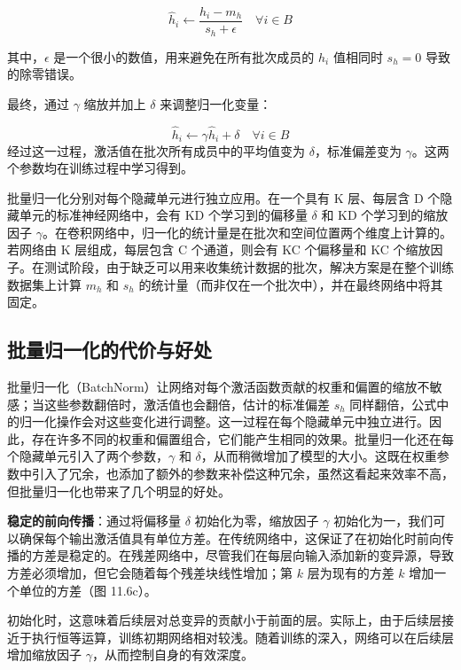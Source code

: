 \documentclass[lang=cn,newtx,10pt,scheme=chinese]{elegantbook}
\begin{document}
\begin{equation}
\hat{h}_i \leftarrow \frac{h_i - m_h}{s_h + \epsilon} \quad \forall i \in B 
\end{equation}

其中，\(\epsilon\) 是一个很小的数值，用来避免在所有批次成员的 \(h_i\) 值相同时 \(s_h = 0\) 导致的除零错误。

最终，通过 \(\gamma\) 缩放并加上 \(\delta\) 来调整归一化变量：

\begin{equation}
\hat{h}_i \leftarrow \gamma\hat{h}_i + \delta \quad \forall i \in B 
\end{equation}
经过这一过程，激活值在批次所有成员中的平均值变为 \(\delta\)，标准偏差变为 \(\gamma\)。这两个参数均在训练过程中学习得到。

批量归一化分别对每个隐藏单元进行独立应用。在一个具有 K 层、每层含 D 个隐藏单元的标准神经网络中，会有 KD 个学习到的偏移量 \(\delta\) 和 KD 个学习到的缩放因子 \(\gamma\)。在卷积网络中，归一化的统计量是在批次和空间位置两个维度上计算的。若网络由 K 层组成，每层包含 C 个通道，则会有 KC 个偏移量和 KC 个缩放因子。在测试阶段，由于缺乏可以用来收集统计数据的批次，解决方案是在整个训练数据集上计算 \(m_h\) 和 \(s_h\) 的统计量（而非仅在一个批次中），并在最终网络中将其固定。

\subsection{批量归一化的代价与好处}
批量归一化（BatchNorm）让网络对每个激活函数贡献的权重和偏置的缩放不敏感；当这些参数翻倍时，激活值也会翻倍，估计的标准偏差 \(s_h\) 同样翻倍，公式中的归一化操作会对这些变化进行调整。这一过程在每个隐藏单元中独立进行。因此，存在许多不同的权重和偏置组合，它们能产生相同的效果。批量归一化还在每个隐藏单元引入了两个参数，\(\gamma\) 和 \(\delta\)，从而稍微增加了模型的大小。这既在权重参数中引入了冗余，也添加了额外的参数来补偿这种冗余，虽然这看起来效率不高，但批量归一化也带来了几个明显的好处。

\textbf{稳定的前向传播}：通过将偏移量 \(\delta\) 初始化为零，缩放因子 \(\gamma\) 初始化为一，我们可以确保每个输出激活值具有单位方差。在传统网络中，这保证了在初始化时前向传播的方差是稳定的。在残差网络中，尽管我们在每层向输入添加新的变异源，导致方差必须增加，但它会随着每个残差块线性增加；第 \(k\) 层为现有的方差 \(k\) 增加一个单位的方差（图 11.6c）。

初始化时，这意味着后续层对总变异的贡献小于前面的层。实际上，由于后续层接近于执行恒等运算，训练初期网络相对较浅。随着训练的深入，网络可以在后续层增加缩放因子 \(\gamma\)，从而控制自身的有效深度。
\end{document}
